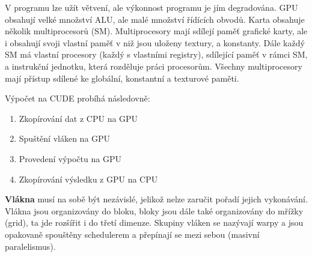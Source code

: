 V programu lze užít větvení, ale výkonnost programu je jím degradována. GPU obsahují velké množství ALU, ale malé množství řídících obvodů. Karta obsahuje několik multiprocesorů (SM). Multiprocesory mají sdílejí paměť grafické karty, ale i obsahují svoji vlastní paměť v niž jsou uloženy textury, a konstanty. Dále každý SM má vlastní procesory (každý s vlastními registry), sdílející paměť v rámci SM, a instrukční jednotku, která rozděluje práci procesorům. Všechny multiprocesory mají přístup sdílené ke globální, konstantní a texturové paměti.

Výpočet na CUDE probíhá následovně:
\begin{enumerate}
\item Zkopírování dat z CPU na GPU
\item Spuštění vláken na GPU
\item Provedení výpočtu na GPU
\item Zkopírování výsledku z GPU na CPU
\end{enumerate}


\textbf{Vlákna} musí na sobě být nezávislé, jelikož nelze zaručit pořadí jejich vykonávání. Vlákna jsou organizovány do bloku, bloky jsou dále také organizovány do mřížky (grid), ta jde rozšířit i do třetí dimenze. Skupiny vláken se nazývají warpy a jsou opakovaně spouštěny schedulerem a přepínají se mezi sebou (masivní paralelismus).





































